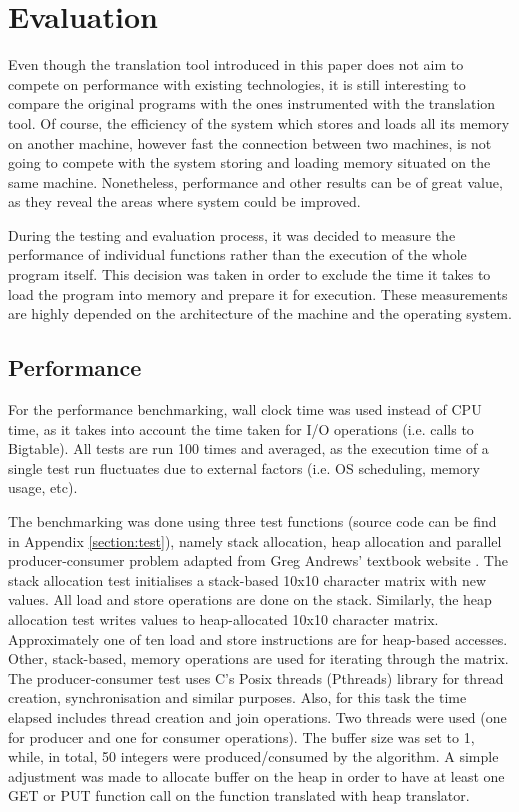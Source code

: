 \documentclass[bsc,frontabs,twoside,singlespacing,parskip,deptreport]{infthesis}     %
\begin{document}
\chapter{Evaluation}

Even though the translation tool introduced in this paper does not aim to compete on performance with existing technologies, it is still interesting to compare the original  programs with the ones instrumented with the translation tool. Of course, the efficiency of the system which stores and loads all its memory on another machine, however fast the connection between two machines, is not going to compete with the system storing and loading memory situated on the same machine. Nonetheless, performance and other results can be of great value, as they reveal the areas where system could be improved.


During the testing and evaluation process, it was decided to measure the performance of individual functions rather than the execution of the whole program itself. This decision was taken in order to exclude the time it takes to load the program into memory and prepare it for execution. These measurements are highly depended on the architecture of the machine and the operating system.

\section{Performance}

For the performance benchmarking, wall clock time was used instead of CPU time, as it takes into account the time taken for I/O operations (i.e. calls to Bigtable). All tests are run 100 times and averaged, as the execution time of a single test run fluctuates due to external factors (i.e. OS scheduling, memory usage, etc).

The benchmarking was done using three test functions (source code can be find in Appendix \ref{section:test}), namely stack allocation, heap allocation and parallel producer-consumer problem adapted from Greg Andrews' textbook website \citep{producer-consumer}. The stack allocation test initialises a stack-based 10x10 character matrix with new values. All load and store operations are done on the stack. Similarly, the heap allocation test writes values to heap-allocated 10x10 character matrix. Approximately one of ten load and store instructions are for heap-based accesses. Other, stack-based, memory operations are used for iterating through the matrix. The producer-consumer test uses C's Posix threads (Pthreads) library for thread creation, synchronisation and similar purposes. Also, for this task the time elapsed includes thread creation and join operations. Two threads were used (one for producer and one for consumer operations). The buffer size was set to 1, while, in total, 50 integers were produced/consumed by the algorithm. A simple adjustment was made to allocate buffer on the heap in order to have at least one GET or PUT function call on the function translated with heap translator.
\end{document}
